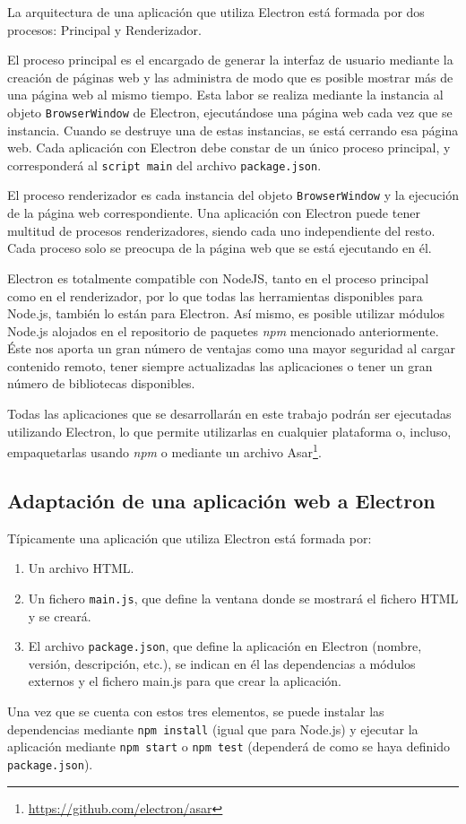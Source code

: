 La arquitectura de una aplicación que utiliza Electron está formada por dos procesos: Principal y Renderizador. 

El proceso principal es el encargado de generar la interfaz de usuario mediante la creación de páginas web y las administra de modo que es posible mostrar más de una página web al mismo tiempo. Esta labor se realiza mediante la instancia al objeto \texttt{BrowserWindow} de Electron, ejecutándose una página web cada vez que se instancia. Cuando se destruye una de estas instancias, se está cerrando esa página web. Cada aplicación con Electron debe constar de un único proceso principal, y corresponderá al \texttt{script main} del archivo \texttt{package.json}.

El proceso renderizador es cada instancia del objeto \texttt{BrowserWindow} y la ejecución de la página web correspondiente. Una aplicación con Electron puede tener multitud de procesos renderizadores, siendo cada uno independiente del resto. Cada proceso solo se preocupa de la página web que se está ejecutando en él.

Electron es totalmente compatible con NodeJS, tanto en el proceso principal como en el renderizador, por lo que todas las herramientas disponibles para Node.js, también lo están para Electron. Así mismo, es posible utilizar módulos Node.js alojados en el repositorio de paquetes \textit{npm} mencionado anteriormente. Éste nos aporta un gran número de ventajas como una mayor seguridad al cargar contenido remoto, tener siempre actualizadas las aplicaciones o tener un gran número de bibliotecas disponibles.

Todas las aplicaciones que se desarrollarán en este trabajo podrán ser ejecutadas utilizando Electron, lo que permite utilizarlas en cualquier plataforma o, incluso, empaquetarlas usando \textit{npm} o mediante un archivo Asar\footnote{\url{https://github.com/electron/asar}}.

\subsection{Adaptación de una aplicación web a Electron}

Típicamente una aplicación que utiliza Electron está formada por:

\begin{enumerate}
\item Un archivo HTML.
\item Un fichero \texttt{main.js}, que define la ventana donde se mostrará el fichero HTML y se creará.
\item El archivo \texttt{package.json}, que define la aplicación en Electron (nombre, versión, descripción, etc.), se indican en él las dependencias a módulos externos y el fichero main.js para que crear la aplicación.
\end{enumerate}
Una vez que se cuenta con estos tres elementos, se puede instalar las dependencias mediante \texttt{npm install} (igual que para Node.js) y ejecutar la aplicación mediante \texttt{npm start} o \texttt{npm test} (dependerá de como se haya definido \texttt{package.json}).

